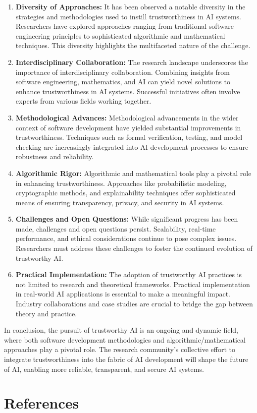 \documentclass{article}
\begin{document}
\begin{enumerate}
    \item \textbf{Diversity of Approaches:} It has been observed a notable diversity in the strategies and methodologies used to instill trustworthiness in AI systems. Researchers have explored approaches ranging from traditional software engineering principles to sophisticated algorithmic and mathematical techniques. This diversity highlights the multifaceted nature of the challenge.

    \item \textbf{Interdisciplinary Collaboration:} The research landscape underscores the importance of interdisciplinary collaboration. Combining insights from software engineering, mathematics, and AI can yield novel solutions to enhance trustworthiness in AI systems. Successful initiatives often involve experts from various fields working together.

    \item \textbf{Methodological Advances:} Methodological advancements in the wider context of software development have yielded substantial improvements in trustworthiness. Techniques such as formal verification, testing, and model checking are increasingly integrated into AI development processes to ensure robustness and reliability.

    \item \textbf{Algorithmic Rigor:} Algorithmic and mathematical tools play a pivotal role in enhancing trustworthiness. Approaches like probabilistic modeling, cryptographic methods, and explainability techniques offer sophisticated means of ensuring transparency, privacy, and security in AI systems.

    \item \textbf{Challenges and Open Questions:} While significant progress has been made, challenges and open questions persist. Scalability, real-time performance, and ethical considerations continue to pose complex issues. Researchers must address these challenges to foster the continued evolution of trustworthy AI.

    \item \textbf{Practical Implementation:} The adoption of trustworthy AI practices is not limited to research and theoretical frameworks. Practical implementation in real-world AI applications is essential to make a meaningful impact. Industry collaborations and case studies are crucial to bridge the gap between theory and practice.

\end{enumerate}

In conclusion, the pursuit of trustworthy AI is an ongoing and dynamic field, where both software development methodologies and algorithmic/mathematical approaches play a pivotal role. The research community's collective effort to integrate trustworthiness into the fabric of AI development will shape the future of AI, enabling more reliable, transparent, and secure AI systems.

\newpage
\section{References}


\end{document}
